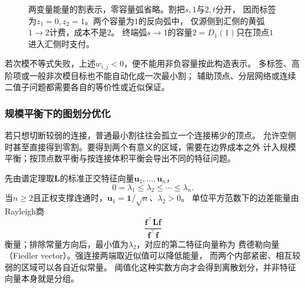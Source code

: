 \begin{figure}[htbp]
  \centering
  
  \caption{两变量能量的割表示，零容量弧省略。割把\(s,1\)与\(2,t\)分开，
  因而标签为\(z_1=0,z_2=1\)。两个容量为\(1\)的反向弧中，
  仅源侧到汇侧的黄弧\(1\to2\)计费，成本不是\(2\)。
  终端弧\(s\to1\)的容量\(2=D_1(1)\)只在顶点\(1\)进入汇侧时支付。}
  \label{fig:graph-theory-binary-energy-cut}
\end{figure}

若次模不等式失败，上述\(w_{i,j}<0\)，便不能用非负容量按此构造表示。
多标签、高阶项或一般非次模目标也不能自动化成一次最小割；
辅助顶点、分层网络或连续二值子问题都需要各自的等价性或近似保证。

\subsubsection{规模平衡下的图划分优化}

若只想切断较弱的连接，普通最小割往往会孤立一个连接稀少的顶点。
允许空侧时甚至直接得到零割。要得到两个有意义的区域，需要在边界成本之外
计入规模平衡；按顶点数平衡与按连接体积平衡会导出不同的特征问题。

先由谱定理取\(\bm L\)的标准正交特征向量\(\bm u_1,\ldots,\bm u_n\)，
\[
  0=\lambda_1\leq\lambda_2\leq\cdots\leq\lambda_n.
\]
当\(n\geq2\)且正权支撑连通时，\(\bm u_1=\bm1/\sqrt n\)、\(\lambda_2>0\)。
单位平方范数下的边差能量由Rayleigh商
\[
  \frac{\bm f^\top\bm L\bm f}{\bm f^\top\bm f}
\]
衡量；排除常量方向后，最小值为\(\lambda_2\)，对应的第二特征向量称为
费德勒向量（Fiedler vector）。强连接两端取近似值可以降低能量，
而两个内部紧密、相互较弱的区域可以各自近似常量。
阈值化这种实数方向才会得到离散划分，并非特征向量本身就是分组。

